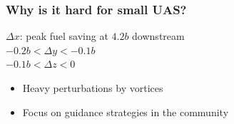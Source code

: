 \documentclass[12pt,svgnames,table,draft=false]{beamer}
\begin{document}
\begin{frame}\frametitle{\hspace{2em} Why is it hard for small UAS?}
\vspace{-1em}
\centering

\begin{tcolorbox}[width=.8\textwidth,colback={gray!10!}]  
 \centering
 $\Delta x$: peak fuel saving at $4.2 b$ downstream \cite{jake2003f}\\
 $-0.2 b < \Delta y < -0.1 b$ \\
 $-0.1 b < \Delta z < 0$ \\
\end{tcolorbox}  


\begin{tcolorbox}[width=.8\textwidth,colback={gray!10!}]  
\begin{itemize}
\item Heavy perturbations by vortices
\item Focus on guidance strategies in the community
\end{itemize}
\end{tcolorbox}  

\end{frame}

\end{document}
